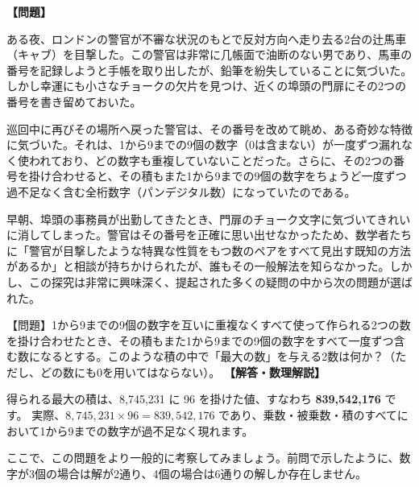 \documentclass[10pt,a4paper,oneside,openany]{ltjsbook}
\begin{document}
\begin{tcolorbox}[colback=softblue,colframe=primaryblue,title=\textbf{第 85 問：辻馬車の番号（全桁数字の最大積） （原題: THE CAB NUMBERS.）},arc=2mm,boxrule=1pt,breakable]
\textbf{【問題】}\par\vspace{0.3em}
ある夜、ロンドンの警官が不審な状況のもとで反対方向へ走り去る2台の辻馬車（キャブ）を目撃した。この警官は非常に几帳面で油断のない男であり、馬車の番号を記録しようと手帳を取り出したが、鉛筆を紛失していることに気づいた。しかし幸運にも小さなチョークの欠片を見つけ、近くの埠頭の門扉にその2つの番号を書き留めておいた。

巡回中に再びその場所へ戻った警官は、その番号を改めて眺め、ある奇妙な特徴に気づいた。それは、1から9までの9個の数字（0は含まない）が一度ずつ漏れなく使われており、どの数字も重複していないことだった。さらに、その2つの番号を掛け合わせると、その積もまた1から9までの9個の数字をちょうど一度ずつ過不足なく含む全桁数字（パンデジタル数）になっていたのである。

早朝、埠頭の事務員が出勤してきたとき、門扉のチョーク文字に気づいてきれいに消してしまった。警官はその番号を正確に思い出せなかったため、数学者たちに「警官が目撃したような特異な性質をもつ数のペアをすべて見出す既知の方法があるか」と相談が持ちかけられたが、誰もその一般解法を知らなかった。しかし、この探究は非常に興味深く、提起された多くの疑問の中から次の問題が選ばれた。

【問題】1から9までの9個の数字を互いに重複なくすべて使って作られる2つの数を掛け合わせたとき、その積もまた1から9までの9個の数字をすべて一度ずつ含む数になるとする。このような積の中で「最大の数」を与える2数は何か？（ただし、どの数にも0を用いてはならない）。
\tcblower
\textbf{【解答・数理解説】}\par\vspace{0.3em}
得られる最大の積は、8,745,231 に 96 を掛けた値、すなわち \textbf{839,542,176} です。
実際、$8,745,231 \times 96 = 839,542,176$ であり、乗数・被乗数・積のすべてにおいて1から9までの数字が過不足なく現れます。

ここで、この問題をより一般的に考察してみましょう。前問で示したように、数字が3個の場合は解が2通り、4個の場合は6通りの解しか存在しません。


\end{tcolorbox}
\end{document}

